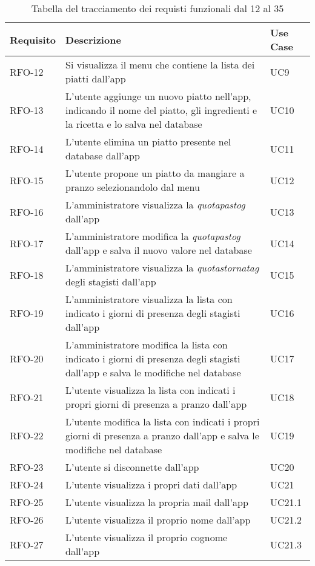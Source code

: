 \begin{table}%
\caption{Tabella del tracciamento dei requisti funzionali dal 12 al 35}
\label{tab:requisiti-funzionalidue}
\begin{tabularx}{\textwidth}{lXl}
\hline
\textbf{Requisito} & \textbf{Descrizione} & \textbf{Use Case}\\
\hline\hline
RFO-12    & Si visualizza il menu che contiene la lista dei piatti dall'app & UC9 \\
\hline
RFO-13    & L'utente aggiunge un nuovo piatto nell'app, indicando il nome del piatto, gli ingredienti e la ricetta e lo salva nel database & UC10 \\
\hline
RFO-14    & L'utente elimina un piatto presente nel database dall'app & UC11 \\
\hline
RFO-15    & L'utente propone un piatto da mangiare a pranzo selezionandolo dal menu & UC12 \\
\hline
RFO-16    & L'amministratore visualizza la \emph{\gls{quotapastog}} dall'app & UC13 \\
\hline
RFO-17    & L'amministratore modifica la \emph{\gls{quotapastog}} dall'app e salva il nuovo valore nel database & UC14 \\
\hline
RFO-18    & L'amministratore visualizza la \emph{\gls{quotastornatag}} degli stagisti dall'app & UC15 \\
\hline
RFO-19    & L'amministratore visualizza la lista con indicato i giorni di presenza degli stagisti dall'app & UC16 \\
\hline
RFO-20    & L'amministratore modifica la lista con indicato i giorni di presenza degli stagisti dall'app e salva le modifiche nel database & UC17 \\
\hline
RFO-21    & L'utente visualizza la lista con indicati i propri giorni di presenza a pranzo dall'app & UC18 \\
\hline
RFO-22    & L'utente modifica la lista con indicati i propri giorni di presenza a pranzo dall'app e salva le modifiche nel database & UC19 \\
\hline
RFO-23    & L'utente si disconnette dall'app & UC20 \\
\hline
RFO-24    & L'utente visualizza i propri dati dall'app & UC21 \\
\hline
RFO-25    & L'utente visualizza la propria mail dall'app & UC21.1 \\
\hline
RFO-26    & L'utente visualizza il proprio nome dall'app & UC21.2 \\
\hline
RFO-27    & L'utente visualizza il proprio cognome dall'app & UC21.3 \\

\end{tabularx}
\end{table}
